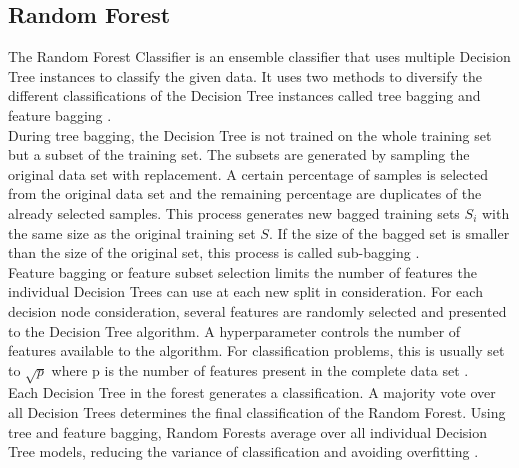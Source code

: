 \subsection{Random Forest}
The Random Forest Classifier is an ensemble classifier that uses multiple 
Decision Tree instances to classify the given data. It uses two methods to 
diversify the different classifications of the Decision Tree instances called 
tree bagging and feature bagging \cite{RN163}.
\\
During tree bagging, the Decision Tree is not trained on the whole training 
set but a subset of the training set. The subsets are generated by sampling 
the original data set with replacement. A certain percentage of samples 
is selected from the original data set and the remaining 
percentage are duplicates of the already selected samples. This 
process generates new bagged training sets $S_i$ with the same size as the 
original training set $S$. If the size of the bagged set is smaller than the 
size of the original set, this process is called sub-bagging \cite{RN163, 
RN170}.
\\
Feature bagging or feature subset selection limits the number of features the 
individual Decision Trees can use at each new split in consideration. 
For each decision node consideration, several features are randomly 
selected and presented to the Decision Tree algorithm. A hyperparameter 
controls the number of features available to the algorithm. For 
classification problems, this is usually set to $\sqrt{p}$ where p is the 
number of features present in the complete data set \cite{RN163, RN166}.
\\
Each Decision Tree in the forest generates a classification. A majority vote 
over all Decision Trees determines the final classification of the Random 
Forest. Using tree and feature bagging, Random Forests average over 
all individual Decision Tree models, reducing the variance of 
classification and avoiding overfitting \cite{RN166}.
